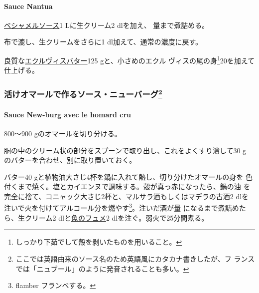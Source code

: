 \begin{recette}
\hypertarget{sauce-nantua}{%
\paragraph{Sauce Nantua}\label{sauce-nantua}}

\protect\hyperlink{sauce-bechamel}{ベシャメルソース}1 Lに生クリーム2
dlを加え、 \deuxtiers{}量まで煮詰める。

布で漉し、生クリームをさらに1\undemi{} dl加えて、通常の濃度に戻す。

良質な\protect\hyperlink{beurre-d-ecrevisse}{エクルヴィスバター}125
gと、小さめのエクル ヴィスの尾の身\footnote{しっかり下茹でして殻を剥いたものを用いること。}20を加えて仕上げる。

\maeaki

\hypertarget{ux6d3bux3051ux30aaux30deux30fcux30ebux3067ux4f5cux308bux30bdux30fcux30b9ux30cbux30e5ux30fcux30d0ux30fcux30b095}{%
\subsubsection[活けオマールで作るソース・ニューバーグ]{\texorpdfstring{活けオマールで作るソース・ニューバーグ\footnote{ここでは英語由来のソース名のため英語風にカタカナ書きしたが、フ
  ランスでは「ニュブール」のように発音されることも多い。}}{活けオマールで作るソース・ニューバーグ}}\label{ux6d3bux3051ux30aaux30deux30fcux30ebux3067ux4f5cux308bux30bdux30fcux30b9ux30cbux30e5ux30fcux30d0ux30fcux30b095}}

\hypertarget{sauce-new-burg-avec-le-homard-cru}{%
\paragraph{Sauce New-burg avec le homard
cru}\label{sauce-new-burg-avec-le-homard-cru}}


800〜900 gのオマールを切り分ける。

胴の中のクリーム状の部分をスプーンで取り出し、これをよくすり潰して30 g
のバターを合わせ、別に取り置いておく。

バター40 gと植物油大さじ4杯を鍋に入れて熱し、切り分けたオマールの身を
色付くまで焼く。塩とカイエンヌで調味する。殻が真っ赤になったら、鍋の油
を完全に捨て、コニャック大さじ2杯と、マルサラ酒もしくはマデラの古酒2
dlを注いで火を付けてアルコール分を燃やす\footnote{flamber フランベする。}。注いだ酒が\untiers{}量
になるまで煮詰めたら、生クリーム2
dlと\protect\hyperlink{fumet-de-poisson}{魚のフュメ}2
dlを注ぐ。弱火で25分間煮る。


\end{recette}
